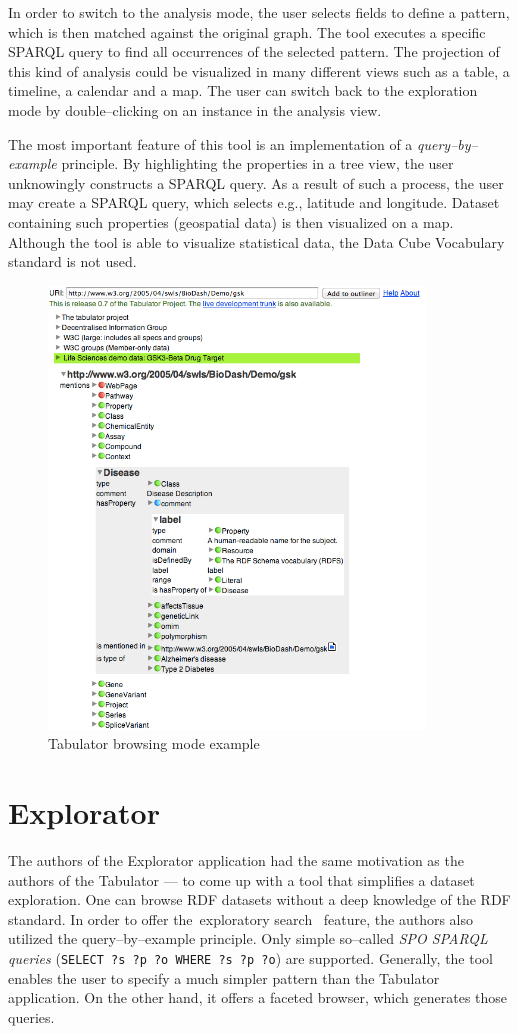 In order to switch to the analysis mode, the user selects fields to define a 
pattern, which is then matched against the original graph. The tool executes a 
specific SPARQL query to find all occurrences of the selected pattern. The 
projection of this kind of analysis could be visualized in many different 
views such as a table, a timeline, a calendar and a map. The user can switch back to the 
exploration mode by double--clicking on an instance in the analysis view.

The most important feature of this tool is an implementation of a 
\emph{query--by--example} principle. By highlighting the properties in a tree view, the user 
unknowingly constructs a SPARQL query. As a 
result of such a process, the user may create a SPARQL query, which selects e.g., 
latitude and longitude. Dataset containing such properties (geospatial data)
is then visualized on a map. Although the tool is able to visualize statistical 
data, the Data Cube Vocabulary standard is not used.


\begin{figure}
	\centering
	\includegraphics[width=100mm]{img/tabulator.png}
	\caption{Tabulator browsing mode example}
	\label{fig:tabulator}
\end{figure}


\section{Explorator}
\label{sec:rw:explorator}
The authors of the Explorator application had the same motivation as the authors 
of the Tabulator --- to come up with a tool that simplifies a dataset 
exploration. One can browse RDF datasets without a deep knowledge of the RDF standard.
In order to offer the~exploratory search~\cite{exploratory-search} feature, the authors also
utilized the query--by--example principle. Only simple so--called \emph{SPO SPARQL 
queries} (\texttt{SELECT ?s ?p ?o WHERE ?s ?p ?o}) are supported. Generally, the tool 
enables the user to specify a much simpler pattern than the Tabulator 
application. On the other hand, it offers a faceted browser, which generates 
those queries.

